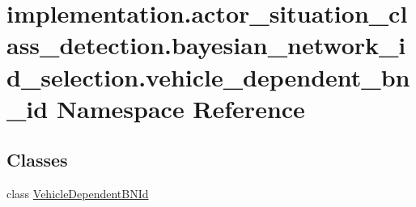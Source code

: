 \hypertarget{namespaceimplementation_1_1actor__situation__class__detection_1_1bayesian__network__id__selection_1_1vehicle__dependent__bn__id}{}\section{implementation.\+actor\+\_\+situation\+\_\+class\+\_\+detection.\+bayesian\+\_\+network\+\_\+id\+\_\+selection.\+vehicle\+\_\+dependent\+\_\+bn\+\_\+id Namespace Reference}
\label{namespaceimplementation_1_1actor__situation__class__detection_1_1bayesian__network__id__selection_1_1vehicle__dependent__bn__id}
\subsection*{Classes}
\begin{DoxyCompactItemize}
\item 
class \hyperlink{classimplementation_1_1actor__situation__class__detection_1_1bayesian__network__id__selection_1_7d108abdd10356de940cd9b1d03c64c8}{Vehicle\+Dependent\+B\+N\+Id}
\end{DoxyCompactItemize}
